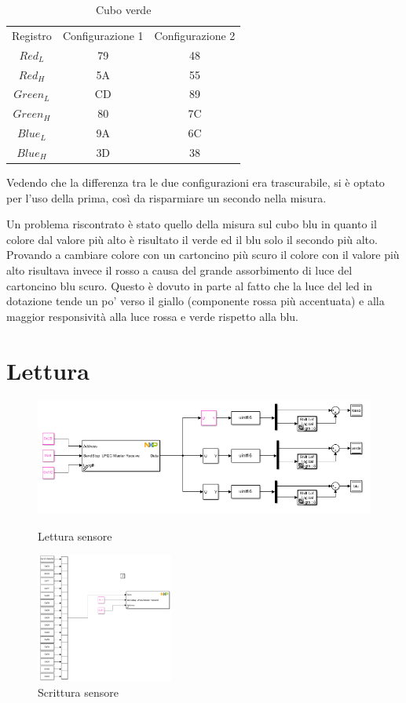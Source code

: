 \documentclass[12pt]{report}
\begin{document}
    \begin{table}
        \centering
        \begin{tabular}{ccc}
            Registro & Configurazione 1 & Configurazione 2\\
             $Red_L$& 79 & 48\\
             $Red_H$& 5A & 55\\
             $Green_L$& CD & 89\\
             $Green_H$& 80 & 7C\\
             $Blue_L$& 9A & 6C\\
             $Blue_H$& 3D & 38
        \end{tabular}
        \caption{Cubo verde}
        \label{tab:cubo_verde}
    \end{table}
    
Vedendo che la differenza tra le due configurazioni era trascurabile, si è optato per l'uso della prima, così da risparmiare un secondo nella misura.

Un problema riscontrato è stato quello della misura sul cubo blu in quanto il colore dal valore più alto è risultato il verde ed il blu solo il secondo più alto. Provando a cambiare colore con un cartoncino più scuro il colore con il valore più alto risultava invece il rosso a causa del grande assorbimento di luce del cartoncino blu scuro. Questo è dovuto in parte al fatto che la luce del led in dotazione tende un po' verso il giallo (componente rossa più accentuata) e alla maggior responsività alla luce rossa e verde rispetto alla blu.

\section{Lettura}

\begin{figure}
    \includegraphics[width=\textwidth]{Immagini_sensore/lettura_sensore.png}
    \caption{Lettura sensore}
    \includegraphics[width=0.4\textwidth]{Immagini_sensore/scrittura_sensore.png}
    \caption{Scrittura sensore}
\end{figure}
\end{document}
